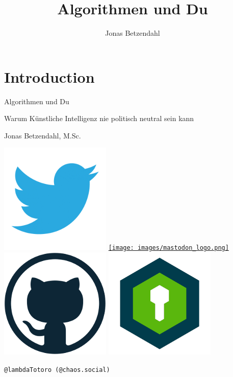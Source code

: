 \documentclass[aspectratio=43,x11names]{beamer}
\author{Jonas Betzendahl}
\title{Algorithmen und Du}
\begin{document}
\section{Introduction}

\begin{frame}
\begin{center}
\vfill
\huge Algorithmen und Du
\normalsize 
\smallskip
\smallskip

Warum Künstliche Intelligenz nie politisch neutral sein kann
\bigskip\bigskip

\large Jonas Betzendahl, M.Sc.
\bigskip\bigskip

\href{https://twitter.com/lambdatotoro}{\includegraphics[scale=0.125]{images/twitter_logo.png}}
\href{https://chaos.social/@lambdatotoro}{\texttt{[image: images/mastodon\_logo.png]}}
\href{https://github.com/jbetzend}{\includegraphics[scale=0.125]{images/github_logo.png}}
\href{https://whispeer.de/en/user/jbetzend}{\includegraphics[scale=0.125]{images/whispeer_logo.png}}

\texttt{@lambdaTotoro (@chaos.social)}
\end{center}
\end{frame}
\end{document}
